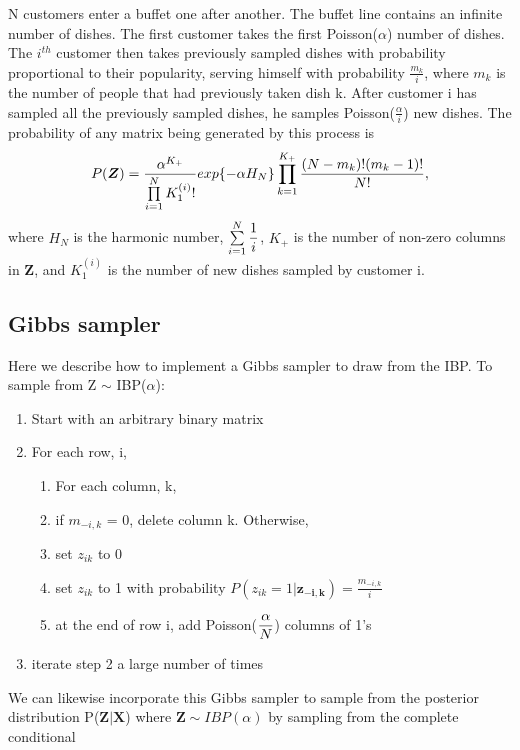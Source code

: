 \noindent
N customers enter a buffet one after another. The buffet line contains an
infinite number of dishes. The first customer takes the first Poisson($\alpha$)
number of dishes. The $i^{th}$ customer then takes previously sampled dishes
with probability proportional to their popularity, serving himself with
probability $\frac{m_k}{i}$, where $m_k$ is the number of people that had
previously taken dish k. After customer i has sampled all the previously sampled
dishes, he samples Poisson($\frac{\alpha}{i}$) new dishes. The probability of 
any matrix being generated by this process is
\begin{equation}
  P(\bm{Z}) = \frac{\alpha^{K_+}}{\prod\limits_{i=1}^{N} K_1^{(i)}!} 
              exp\{-\alpha H_N\}\prod\limits_{k=1}^{K_+}
              \frac{(N-m_k)!(m_k-1)!}{N!},
\end{equation}
where $H_N$ is the harmonic number, $\sum\limits_{i=1}^{N}\displaystyle\frac{1}{i}$, $K_+$ is the 
number of non-zero columns in $\bm Z$, and $K_1^{(i)}$ is the number of new dishes
sampled by customer i. %

\subsection{Gibbs sampler}
Here we describe how to implement a Gibbs sampler to draw from the IBP. 
To sample from Z $\sim$ IBP($\alpha$):

\begin{enumerate}
  \item Start with an arbitrary binary matrix
  \item For each row, i,
  \begin{enumerate}
    \item For each column, k,
    \item if $m_{-i,k}$ = 0, delete column k. Otherwise,
    \item set $z_{ik}$ to 0
    \item set $z_{ik}$ to 1 with probability $P(z_{ik}=1|\bm{z_{-i,k}}) = \frac{m_{-i,k}}{i}$
    \item at the end of row i, add Poisson($\displaystyle\frac{\alpha}{N}$) columns of 1's
  \end{enumerate}
  \item iterate step 2 a large number of times
\end{enumerate}
We can likewise incorporate this Gibbs sampler to sample from the posterior distribution P($\bm{Z|X}$)
where $\bm Z \sim IBP(\alpha)$ by sampling from the complete conditional

